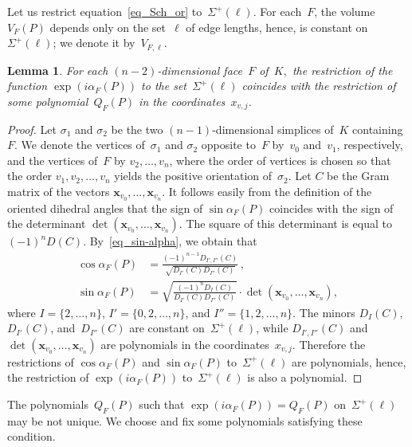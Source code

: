 \documentclass[reqno,tbtags,12pt]{amsart}
\numberwithin{equation}{section}
\newcommand{\bx}{\mathbf{x}}
\newcommand{\bell}{\boldsymbol{\ell}}
\newtheorem{lem}[theorem]{Lemma}
\theoremstyle{definition}
\begin{document}
Let us restrict equation~\eqref{eq_Sch_or} to~$\Sigma^+(\bell)$. For each~$F$, the volume~$V_F( P)$ depends only on the set~$\bell$ of edge lengths, hence, is constant on~$\Sigma^+(\bell)$; we denote it by~$V_{F,\bell}$. 


\begin{lem}
For each $(n-2)$-dimensional face~$F$ of~$K,$ the restriction of the function $\exp(i\alpha_F( P))$ to the set\/~$\Sigma^+(\bell)$ coincides with the restriction of some polynomial~$Q_F( P)$ in the coordinates~$x_{v,j}$.
\end{lem}



\begin{proof} 
Let $\sigma_1$ and $\sigma_2$ be the two $(n-1)$-dimensional simplices of~$K$ containing~$F$. We denote the vertices of~$\sigma_1$ and $\sigma_2$ opposite to~$F$ by~$v_0$ and~$v_1$, respectively, and the vertices of~$F$ by $v_2,\ldots,v_{n}$, where the order of vertices is chosen so that the order $v_1,v_2,\ldots,v_{n}$ yields the positive orientation of~$\sigma_2$. Let $C$ be the Gram matrix of the vectors $\bx_{v_0},\ldots,\bx_{v_n}$. It follows easily from the definition of the oriented dihedral angles that the sign of $\sin\alpha_F(P)$ coincides with the sign of the determinant $\det(\bx_{v_0},\ldots,\bx_{v_n})$. The square of this determinant is equal to $(-1)^nD(C)$. By~\eqref{eq_sin-alpha}, we obtain that 
\begin{align*}
\cos\alpha_F(P)&=\frac{(-1)^{n-1}D_{I',I''}(C)}{\sqrt{D_{I'}(C)D_{I''}(C)}}\,,\\
\sin\alpha_F(P)&=\sqrt{\frac{(-1)^nD_I(C)}{D_{I'}(C)D_{I''}(C)}}\cdot\det(\bx_{v_0},\ldots,\bx_{v_n}),
\end{align*}
where $I=\{2,\ldots,n\}$, $I'=\{0,2,\ldots,n\}$, and $I''=\{1,2,\ldots,n\}$. The minors $D_I(C)$, $D_{I'}(C)$, and~$D_{I''}(C)$ are constant on~$\Sigma^+(\bell)$, while $D_{I',I''}(C)$ and $\det(\bx_{v_0},\ldots,\bx_{v_n})$ are polynomials in the coordinates~$x_{v,j}$. Therefore the restrictions of $\cos\alpha_F(P)$ and $\sin\alpha_F(P)$ to~$\Sigma^+(\bell)$ are polynomials, hence,  the restriction of $\exp(i\alpha_F( P))$ to~$\Sigma^+(\bell)$ is also a polynomial.
\end{proof}

The polynomials~$Q_F(P)$ such that $\exp(i\alpha_F( P))=Q_F(P)$ on~$\Sigma^+(\bell)$ may be not unique. We choose and fix some polynomials satisfying these condition.
\end{document}
